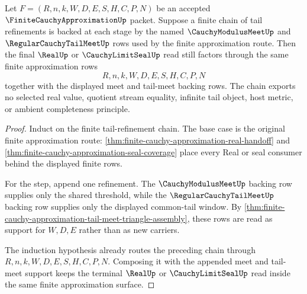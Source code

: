 \begin{theorem}
\label{thm:finite-cauchy-approximation-tail-induction}
Let $F=(R,n,k,W,D,E,S,H,C,P,N)$ be an accepted $\FiniteCauchyApproximationUp$ packet. Suppose a finite chain of tail refinements is backed at each stage by the named $\CauchyModulusMeetUp$ and $\RegularCauchyTailMeetUp$ rows used by the finite approximation route. Then the final $\RealUp$ or $\CauchyLimitSealUp$ read still factors through the same finite approximation rows
$$
R,n,k,W,D,E,S,H,C,P,N
$$
together with the displayed meet and tail-meet backing rows. The chain exports no selected real value, quotient stream equality, infinite tail object, host metric, or ambient completeness principle.
\end{theorem}
\begin{proof}
Induct on the finite tail-refinement chain. The base case is the original finite approximation route: \autoref{thm:finite-cauchy-approximation-real-handoff} and \autoref{thm:finite-cauchy-approximation-seal-coverage} place every Real or seal consumer behind the displayed finite rows.

For the step, append one refinement. The $\CauchyModulusMeetUp$ backing row supplies only the shared threshold, while the $\RegularCauchyTailMeetUp$ backing row supplies only the displayed common-tail window. By \autoref{thm:finite-cauchy-approximation-tail-meet-triangle-assembly}, these rows are read as support for $W,D,E$ rather than as new carriers.

The induction hypothesis already routes the preceding chain through $R,n,k,W,D,E,S,H,C,P,N$. Composing it with the appended meet and tail-meet support keeps the terminal $\RealUp$ or $\CauchyLimitSealUp$ read inside the same finite approximation surface.
\end{proof}

